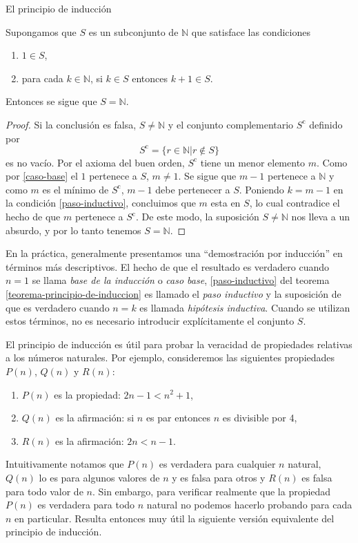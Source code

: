 \begin{section}{El principio de inducción}
\begin{teorema}\label{teorema-principio-de-induccion} Supongamos que $S$ es un subconjunto de $\mathbb N$ que satisface las condiciones 
\begin{enumerate}[label=\textit{\alph*)}]
\item\label{caso-base} $1 \in S$,
\item\label{paso-inductivo} para cada $k \in \mathbb N$, si $ k \in S$ entonces $k+1\in S$.
\end{enumerate}
Entonces se sigue que $S=\mathbb N$.
\end{teorema}
\begin{proof}Si la conclusión es falsa, $S \not= \mathbb N$ y
el conjunto complementario $S^{\text{c}}$ definido por
$$
S^{\text{c}}= \{ r \in \mathbb N | r\not\in S\}
$$
 es no vacío. Por el axioma del buen orden, $S^{\text{c}}$ tiene un menor elemento $m$. Como por \ref{caso-base} el $1$ pertenece a $S$, $m\not=1$. Se sigue que $m-1$ pertenece a $\mathbb N$ y como $m$ es el mínimo de $S^{\text{c}}$, $m-1$ debe pertenecer a $S$. Poniendo $k=m-1$ en la condición \ref{paso-inductivo}, concluimos que $m$ esta en $S$, lo cual contradice el hecho de que $m$ pertenece a $S^{\text{c}}$. De este modo, la suposición $S \not= \mathbb N$ nos lleva a un absurdo, y por lo tanto tenemos $S= \mathbb N$. 
 \end{proof}

En la práctica, generalmente presentamos una ``demostración por inducción'' en términos más descriptivos. El hecho de que el resultado es verdadero cuando $n=1$ se llama \textit{base de la inducción} o \textit{caso base}, \ref{paso-inductivo} del teorema \ref{teorema-principio-de-induccion} es llamado  el \textit{paso inductivo} y la suposición de que es verdadero cuando $n=k$ es llamada \textit{hipótesis inductiva}. Cuando se utilizan estos términos, no es necesario introducir explícitamente el conjunto $S$.


El principio de inducción es útil para probar la veracidad de propiedades relativas a los números naturales. Por ejemplo, consideremos las siguientes propiedades $P(n)$, $Q(n)$ y $R(n)$:
\begin{enumerate}[label=\textit{\alph*)}]
\item $P(n)$ es la propiedad: $2n -1 < n^2 + 1$,
\item $Q(n)$ es la afirmación: si $n$ es par entonces $n$ es divisible por 4,
\item $R(n)$ es la afirmación: $2n < n- 1$.
\end{enumerate}
Intuitivamente notamos que $P(n)$ es verdadera para cualquier $n$ natural, $Q(n)$ lo es para algunos valores de $n$ y es falsa para otros y $R(n)$ es falsa para todo valor de $n$. Sin embargo, para verificar realmente que la propiedad $P(n)$ es verdadera para todo $n$ natural no podemos hacerlo probando para cada $n$ en particular. Resulta entonces muy útil la siguiente versión equivalente del principio de inducción.


\end{section}
